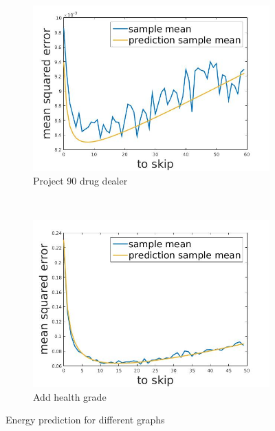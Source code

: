 \documentclass[12pt]{report}
\begin{document}
\begin{figure}[h]    
        \centering
    \begin{subfigure}[b]{0.4\textwidth}
        \includegraphics[width=\textwidth]{pr90dealer}
        \caption{ Project 90 drug dealer  }

    \end{subfigure}
    ~
    \begin{subfigure}[b]{0.4\textwidth}
        \includegraphics[width=\textwidth]{studGrade}
        \caption{ Add health grade }

    \end{subfigure}
    
    \caption{Energy prediction for different graphs}
    \label{fig:energyPrediction}
\end{figure}
\end{document}
